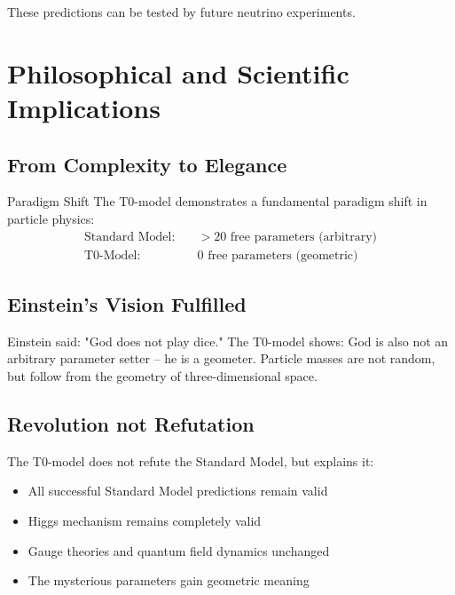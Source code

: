 \documentclass[12pt,a4paper]{article}
\begin{document}
	These predictions can be tested by future neutrino experiments.
	
	\section{Philosophical and Scientific Implications}
	\label{sec:philosophical_implications}
	
	\subsection{From Complexity to Elegance}
	\label{subsec:complexity_to_elegance}
	
	\begin{important}{Paradigm Shift}{}
		The T0-model demonstrates a fundamental paradigm shift in particle physics:
		\begin{align}
			\text{Standard Model:} \quad &> 20 \text{ free parameters (arbitrary)} \\
			\text{T0-Model:} \quad &0 \text{ free parameters (geometric)}
		\end{align}
	\end{important}
	
	\subsection{Einstein's Vision Fulfilled}
	\label{subsec:einstein_vision}
	
	Einstein said: "God does not play dice." The T0-model shows: God is also not an arbitrary parameter setter -- he is a geometer. Particle masses are not random, but follow from the geometry of three-dimensional space.
	
	\subsection{Revolution not Refutation}
	\label{subsec:revolution_not_refutation}
	
	The T0-model does not refute the Standard Model, but explains it:
	
	\begin{itemize}
		\item All successful Standard Model predictions remain valid
		\item Higgs mechanism remains completely valid
		\item Gauge theories and quantum field dynamics unchanged
		\item The mysterious parameters gain geometric meaning
	\end{itemize}
	
\end{document}
